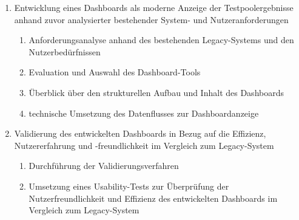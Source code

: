 \begin{enumerate}
\begin{enumerate}
        \item Fokussierung auf die Problemstellung der Effizienz und Übersichtlichkeit verteilter Testsysteme
        \item Beitrag moderner Dashboards zur Effizienzsteigerung und verbesserten Übersichtlichkeit von Legacy-Testsystemen
        \item Methodisches Vorgehen zur Entwicklung eines Dashboards als moderne Anzeige der Testpoolergebnisse
        \begin{enumerate}
            \item Analyse des Ist-Zustandes der Testpool-Ergebnisanzeige zur Identifikation bestehender Anforderungen
            \item Entwicklung eines Dashboards als moderne Ergebnisübersicht
            \item Usability Test zur Validierung der gestellten Anforderungen an das Dashboard
            \item Nutzerbefragung zur Validierung der Benutzererfahrung im Rahmen des Usability-Tests
        \end{enumerate}
    \end{enumerate}
    \item Entwicklung eines Dashboards als moderne Anzeige der Testpoolergebnisse anhand zuvor analysierter bestehender System- und Nutzeranforderungen
    \begin{enumerate}
        \item Anforderungsanalyse anhand des bestehenden Legacy-Systems und den Nutzerbedürfnissen
        \item Evaluation und Auswahl des Dashboard-Tools
        \item Überblick über den strukturellen Aufbau und Inhalt des Dashboards
        \item technische Umsetzung des Datenflusses zur Dashboardanzeige
    \end{enumerate}
    \item Validierung des entwickelten Dashboards in Bezug auf die Effizienz, Nutzererfahrung und -freundlichkeit im Vergleich zum Legacy-System
    \begin{enumerate}
        \item Durchführung der Validierungsverfahren
        \item Umsetzung eines Usability-Tests zur Überprüfung der Nutzerfreundlichkeit und Effizienz des entwickelten Dashboards im Vergleich zum Legacy-System
        \begin{enumerate}

\end{enumerate}
\end{enumerate}
\end{enumerate}

